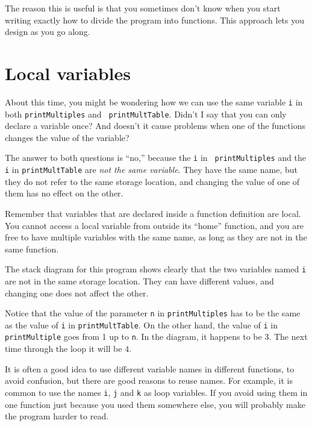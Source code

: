 The reason this is useful is that you sometimes don't know
when you start writing exactly how to divide the program into
functions.  This approach lets you design as you go along.

\section{Local variables}

About this time, you might be wondering how we can use the same
variable {\tt i} in both {\tt printMultiples} and {\tt
printMultTable}.  Didn't I say that you can only declare a variable
once?  And doesn't it cause problems when one of the functions changes
the value of the variable?

The answer to both questions is ``no,'' because the {\tt i} in {\tt
printMultiples} and the {\tt i} in {\tt printMultTable} are
{\em not the same variable}.  They have the same name, but
they do not refer to the same storage location, and changing
the value of one of them has no effect on the other.


Remember that variables that are declared inside a function definition
are local.  You cannot access a local variable from outside its
``home'' function, and you are free to have multiple variables with
the same name, as long as they are not in the same function.

The stack diagram for this program shows clearly that the
two variables named {\tt i} are not in the same storage location.
They can have different values, and changing one does not affect
the other.

\vspace{0.1in}
\centerline{}
\vspace{0.1in}
%
Notice that the value of the parameter {\tt n} in
{\tt printMultiples} has to be the same as the value
of {\tt i} in {\tt printMultTable}.  On the other hand,
the value of {\tt i} in {\tt printMultiple} goes
from 1 up to {\tt n}.  In the diagram, it happens to be 3.
The next time through the loop it will be 4.

It is often a good idea to use different variable names in
different functions, to avoid confusion, but there are good
reasons to reuse names.  For example, it is common to
use the names {\tt i}, {\tt j} and {\tt k} as loop variables.
If you avoid using them in one function just because you
used them somewhere else, you will probably make the program
harder to read.

